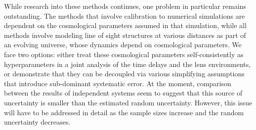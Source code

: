 While research into these methods continues, one problem in particular
remains outstanding. The methods that involve calibration to numerical
simulations are dependent on the cosmological parameters assumed in
that simulation, while all methods involve modeling line of sight
structures at various distances as part of an evolving universe, whose
dynamics depend on cosmological parameters. We face two options:
either treat these cosmological parameters self-consistently as
hyperparameters in a joint analysis of the time delays and the lens
environments, or demonstrate that they can be decoupled via various
simplifying assumptions that introduce sub-dominant systematic
error. At the moment, comparison between the results of independent
systems \citep{Suy++13} seem to suggest that this source of
uncertainty is smaller than the estimated random uncertainty. However,
this issue will have to be addressed in detail as the sample sizes
increase and the random uncertainty decreases.

